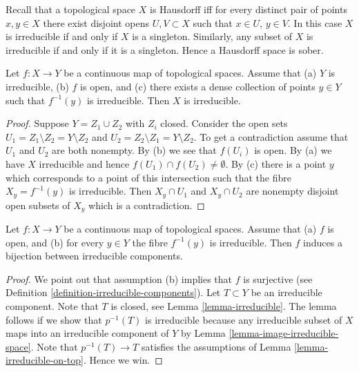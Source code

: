 \begin{example}
\label{example-Hausdorff}
Recall that a topological space $X$ is Hausdorff iff for every
distinct pair of points $x, y \in X$ there exist disjoint
opens $U, V \subset X$ such that $x \in U$, $y \in V$.
In this case $X$ is irreducible if and only if $X$ is
a singleton. Similarly, any subset of $X$ is irreducible
if and only if it is a singleton. Hence a Hausdorff space is
sober.
\end{example}

\begin{lemma}
\label{lemma-irreducible-on-top}
Let $f : X \to Y$ be a continuous map of topological spaces.
Assume that
(a) $Y$ is irreducible,
(b) $f$ is open, and
(c) there exists a dense collection of points $y \in Y$ such
that $f^{-1}(y)$ is irreducible.
Then $X$ is irreducible.
\end{lemma}

\begin{proof}
Suppose $Y = Z_1 \cup Z_2$ with $Z_i$ closed.
Consider the open sets $U_1 = Z_1 \setminus Z_2 = Y \setminus Z_2$ and
$U_2 = Z_2 \setminus Z_1 = Y \setminus Z_2$. To get a contradiction
assume that $U_1$ and $U_2$ are both nonempty. By (b) we see that $f(U_i)$
is open. By (a) we have $X$ irreducible and hence
$f(U_1) \cap f(U_2) \not = \emptyset$. By (c) there is a point $y$ which
corresponds to a point of this intersection such that the fibre
$X_y = f^{-1}(y)$ is irreducible. Then $X_y \cap U_1$ and
$X_y \cap U_2$ are nonempty disjoint open subsets of $X_y$ which is
a contradiction.
\end{proof}

\begin{lemma}
\label{lemma-irreducible-fibres-irreducible-components}
Let $f : X \to Y$ be a continuous map of topological spaces.
Assume that (a) $f$ is open, and
(b) for every $y \in Y$ the fibre $f^{-1}(y)$ is irreducible.
Then $f$ induces a bijection between irreducible components.
\end{lemma}

\begin{proof}
We point out that assumption (b) implies that $f$ is surjective (see
Definition \ref{definition-irreducible-components}).
Let $T \subset Y$ be an irreducible component.
Note that $T$ is closed, see Lemma \ref{lemma-irreducible}.
The lemma follows if we show that $p^{-1}(T)$ is irreducible
because any irreducible subset of $X$ maps into an irreducible component
of $Y$ by Lemma \ref{lemma-image-irreducible-space}.
Note that $p^{-1}(T) \to T$ satisfies the assumptions
of Lemma \ref{lemma-irreducible-on-top}. Hence we win.
\end{proof}


